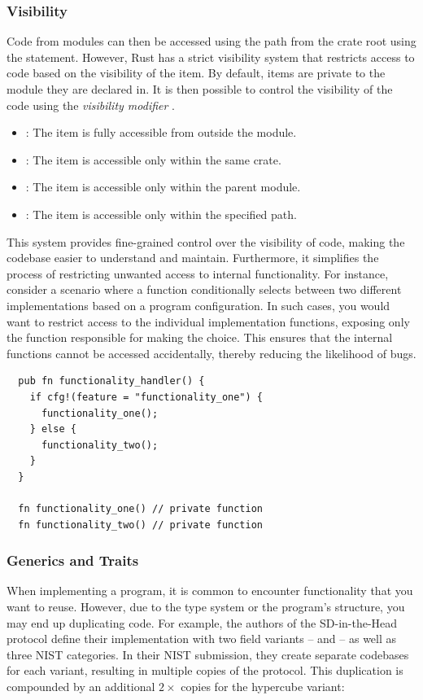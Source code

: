 \documentclass[11pt]{report}
\theoremstyle{definition}
\theoremstyle{plain}
\begin{document}
\subsubsection{Visibility} %
Code from modules can then be accessed using the path from the crate root using the  statement. However, Rust has a strict visibility system that restricts access to code based on the visibility of the item. By default, items are private to the module they are declared in. It is then possible to control the visibility of the code using the \textit{visibility modifier} .
\begin{itemize}[parsep=0pt, itemsep=0pt]
  \item {}: The item is fully accessible from outside the module.
  \item {}: The item is accessible only within the same crate.
  \item {}: The item is accessible only within the parent module.
  \item {}: The item is accessible only within the specified path.
\end{itemize}
This system provides fine-grained control over the visibility of code, making the codebase easier to understand and maintain. Furthermore, it simplifies the process of restricting unwanted access to internal functionality. For instance, consider a scenario where a function conditionally selects between two different implementations based on a program configuration. In such cases, you would want to restrict access to the individual implementation functions, exposing only the function responsible for making the choice. This ensures that the internal functions cannot be accessed accidentally, thereby reducing the likelihood of bugs.
\begin{verbatim}
  pub fn functionality_handler() {
    if cfg!(feature = "functionality_one") {
      functionality_one();
    } else {
      functionality_two();
    }
  }

  fn functionality_one() // private function
  fn functionality_two() // private function
\end{verbatim}

\subsubsection{Generics and Traits}

When implementing a program, it is common to encounter functionality that you want to reuse. However, due to the type system or the program's structure, you may end up duplicating code. For example, the authors of the SD-in-the-Head protocol define their implementation with two field variants --  and  -- as well as three NIST categories. In their NIST submission, they create separate codebases for each variant, resulting in multiple copies of the protocol. This duplication is compounded by an additional $2\times$ copies for the hypercube variant:
\end{document}
